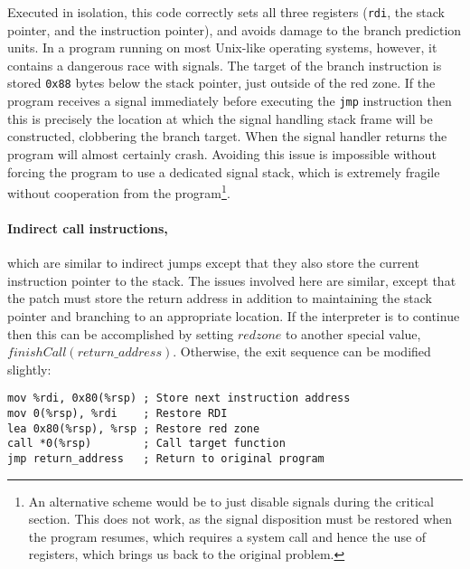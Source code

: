 Executed in isolation, this code correctly sets all three registers
(\verb|rdi|, the stack pointer, and the instruction pointer), and
avoids damage to the branch prediction units.  In a program running on
most Unix-like operating systems, however, it contains a dangerous
race with signals.  The target of the branch instruction is stored
\verb|0x88| bytes below the stack pointer, just outside of the red
zone.  If the program receives a signal immediately before executing
the \verb|jmp| instruction then this is precisely the location at
which the signal handling stack frame will be constructed, clobbering
the branch target.  When the signal handler returns the program will
almost certainly crash.  Avoiding this issue is impossible without
forcing the program to use a dedicated signal stack, which is
extremely fragile without cooperation from the program\footnote{An
  alternative scheme would be to just disable signals during the
  critical section.  This does not work, as the signal disposition
  must be restored when the program resumes, which requires a system
  call and hence the use of registers, which brings us back to the
  original problem.}.



\paragraph{Indirect call instructions,} which are similar to indirect jumps
except that they also store the current instruction pointer to the
stack.  The issues involved here are similar,
except that the patch must store the return address in addition to
maintaining the stack pointer and branching to an appropriate
location.  If the interpreter is to continue then this can be
accomplished by setting $redzone$ to another special value,
$finishCall(return\_address)$.  Otherwise, the exit sequence can be
modified slightly:

\begin{verbatim}
mov %rdi, 0x80(%rsp) ; Store next instruction address
mov 0(%rsp), %rdi    ; Restore RDI
lea 0x80(%rsp), %rsp ; Restore red zone
call *0(%rsp)        ; Call target function
jmp return_address   ; Return to original program
\end{verbatim}

